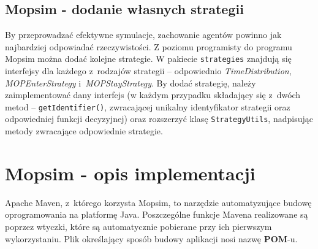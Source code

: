 \subsection{Mopsim - dodanie własnych strategii}
By przeprowadzać efektywne symulacje, zachowanie agentów powinno jak najbardziej odpowiadać rzeczywistości. Z poziomu programisty do programu Mopsim można dodać kolejne strategie. W pakiecie \texttt{strategies} znajdują się interfejsy dla każdego z~rodzajów strategii -- odpowiednio \textit{TimeDistribution}, \textit{MOPEnterStrategy} i~\textit{MOPStayStrategy}. By dodać strategię, należy zaimplementować dany interfejs (w każdym przypadku składający się z~dwóch metod -- \texttt{getIdentifier()}, zwracającej unikalny identyfikator strategii oraz odpowiedniej funkcji decyzyjnej) oraz rozszerzyć klasę \texttt{StrategyUtils}, nadpisując metody zwracające odpowiednie strategie.

\section[Opis implementacji]{Mopsim - opis implementacji}
Apache Maven, z~którego korzysta Mopsim, to narzędzie automatyzujące budowę oprogramowania na platformę Java. Poszczególne funkcje Mavena realizowane są poprzez wtyczki, które są automatycznie pobierane przy ich pierwszym wykorzystaniu. Plik określający sposób budowy aplikacji nosi nazwę \textbf{POM}-u.

\begin{figure}[!htb]
\label{mopsim_structure}
\end{figure}
